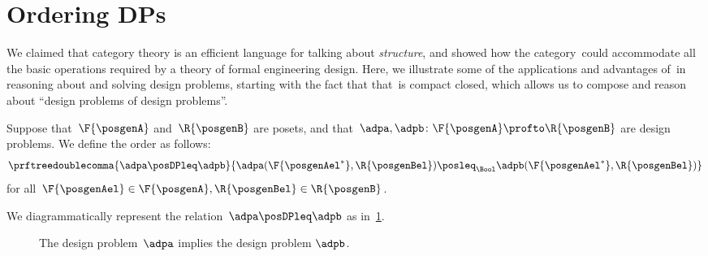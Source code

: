 
\section{Ordering DPs}
\label{sec:ordering-order}

We claimed that category theory is an efficient language for talking about \emph{structure}, and showed how the category~\DP could accommodate all the basic operations required by a theory of formal engineering design.
Here, we illustrate some of the applications and advantages of~\DP in reasoning about and solving design problems, starting with the fact that that~\DP is compact closed, which allows us to compose and reason about ``design problems of design problems''.

\begin{definition}[Order on~\DP]
    \label{def:DP_loc_pos}
    Suppose that~$\F{\posgenA}$ and~$\R{\posgenB}$ are posets, and that~$\adpa,\adpb \colon \F{\posgenA} \profto \R{\posgenB}$ are design problems.
    We define the order as follows:
    \begin{equation*}
        \prftreedoublecomma{
            \adpa \posDPleq \adpb
        }{
            \adpa(\F{\posgenAel^*},\R{\posgenBel}) \posleq_\Bool \adpb(\F{\posgenAel^*},\R{\posgenBel})
        }
    \end{equation*}
    for all~$\F{\posgenAel} \in \F{\posgenA},\R{\posgenBel} \in \R{\posgenB}$.
\end{definition}

We diagrammatically represent the relation~$\adpa \posDPleq \adpb$ as in~\cref{fig:dpimplies}.

\begin{figure}[h!]
    \centering
    \caption{The design problem~$\adpa$ implies the design problem $\adpb$.}
    \label{fig:dpimplies}
\end{figure}

